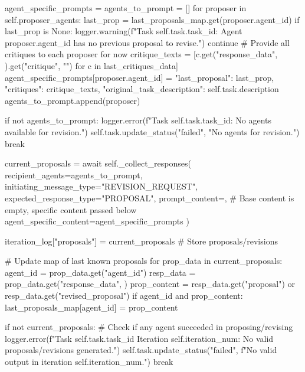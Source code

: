 \documentclass{amsbook}
\theoremstyle{definition}
\theoremstyle{remark}
\numberwithin{equation}{chapter} %
\begin{document}
\begin{python}
                    agent_specific_prompts = {}
                    agents_to_prompt = []
                    for proposer in self.proposer_agents:
                        last_prop = last_proposals_map.get(proposer.agent_id)
                        if last_prop is None:
                            logger.warning(f"Task {self.task.task_id}: Agent {proposer.agent_id} has no previous proposal to revise.")
                            continue
                        # Provide all critiques to each proposer for now
                        critique_texts = [c.get("response_data", {}).get("critique", "") for c in last_critiques_data]
                        agent_specific_prompts[proposer.agent_id] = {
                            "last_proposal": last_prop,
                            "critiques": critique_texts,
                            "original_task_description": self.task.description
                        }
                        agents_to_prompt.append(proposer)

                    if not agents_to_prompt:
                        logger.error(f"Task {self.task.task_id}: No agents available for revision.")
                        self.task.update_status("failed", "No agents for revision.")
                        break

                    current_proposals = await self._collect_responses(
                        recipient_agents=agents_to_prompt,
                        initiating_message_type="REVISION_REQUEST",
                        expected_response_type="PROPOSAL",
                        prompt_content={}, # Base content is empty, specific content passed below
                        agent_specific_content=agent_specific_prompts
                    )

                iteration_log["proposals"] = current_proposals # Store proposals/revisions

                # Update map of last known proposals
                for prop_data in current_proposals:
                     agent_id = prop_data.get("agent_id")
                     resp_data = prop_data.get("response_data", {})
                     prop_content = resp_data.get("proposal") or resp_data.get("revised_proposal")
                     if agent_id and prop_content:
                          last_proposals_map[agent_id] = prop_content

                if not current_proposals: # Check if any agent succeeded in proposing/revising
                    logger.error(f"Task {self.task.task_id} Iteration {self.iteration_num}: No valid proposals/revisions generated.")
                    self.task.update_status("failed", f"No valid output in iteration {self.iteration_num}.")
                    break


\end{python}
\end{document}
